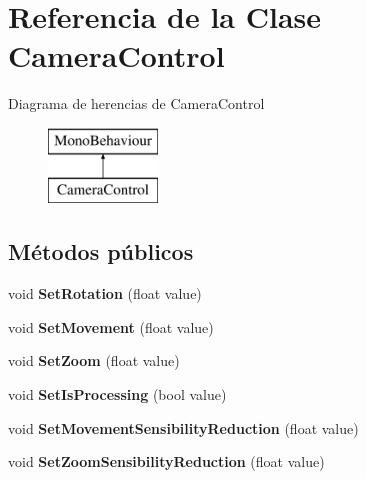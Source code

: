\hypertarget{class_camera_control}{}\section{Referencia de la Clase Camera\+Control}
\label{class_camera_control}
Diagrama de herencias de Camera\+Control\begin{figure}[H]
\begin{center}
\leavevmode
\includegraphics[height=2.000000cm]{class_camera_control}
\end{center}
\end{figure}
\subsection*{Métodos públicos}
\begin{DoxyCompactItemize}
\item 
\mbox{\label{class_camera_control_a7dfdd3783b057fd9941f20a634b95b03}} 
void {\bfseries Set\+Rotation} (float value)
\item 
\mbox{\label{class_camera_control_a2307b3b28fd8f9f40248fc0441f916de}} 
void {\bfseries Set\+Movement} (float value)
\item 
\mbox{\label{class_camera_control_a6c7f7816a4bff734280e19f65ef9df87}} 
void {\bfseries Set\+Zoom} (float value)
\item 
\mbox{\label{class_camera_control_a715690bfd42a136da5b5880debb2e420}} 
void {\bfseries Set\+Is\+Processing} (bool value)
\item 
\mbox{\label{class_camera_control_ab3ac3df0eb5347d1f7eb356f4226a696}} 
void {\bfseries Set\+Movement\+Sensibility\+Reduction} (float value)
\item 
\mbox{\label{class_camera_control_a77c2147ce9a478e7fbee646fe049aa02}} 
void {\bfseries Set\+Zoom\+Sensibility\+Reduction} (float value)
\end{DoxyCompactItemize}
